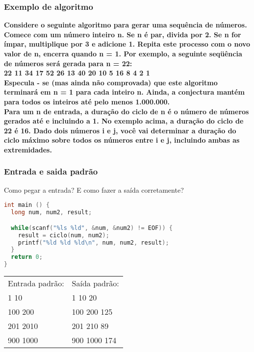 \begin{frame}
  \frametitle{Exemplo de algoritmo}
  \textbf{\small Considere o seguinte algoritmo para gerar uma sequência de números. Comece com um número inteiro n. Se n é par, divida por 2. Se n for ímpar, multiplique por 3 e adicione 1. Repita este processo com o novo valor de n, encerra quando n = 1. Por exemplo, a seguinte seqüência de números será gerada para n = 22:\\22 11 34 17 52 26 13 40 20 10 5 16 8 4 2 1\\}
  \textbf{\small Especula - se (mas ainda não comprovada) que este algoritmo terminará em n = 1 para cada inteiro n. Ainda, a conjectura mantém para todos os inteiros até pelo menos 1.000.000.\\Para um n de entrada, a duração do ciclo de n é o número de números gerados até e incluindo a 1. No exemplo acima, a duração do ciclo de 22 é 16. Dado dois números i e j, você vai determinar a duração do ciclo máximo sobre todos os números entre i e j, incluindo ambas as extremidades.}
\end{frame}

\begin{frame}[fragile]
  \frametitle{Entrada e saida padrão}
  Como pegar a entrada? E como fazer a saída corretamente?
  \begin{lstlisting}[language=c]
int main () {
  long num, num2, result;

  while(scanf("%ls %ld", &num, &num2) != EOF)) {
    result = ciclo(num, num2);
    printf("%ld %ld %ld\n", num, num2, result); 
  }
  return 0;
}
  \end{lstlisting}
  \begin{tabular}{ll}\\
    Entrada padrão: &Saída padrão:\\
    1 10 &1 10 20\\
    100 200 &100 200 125\\
    201 2010 &201 210 89\\
    900 1000 &900 1000 174\\	
  \end{tabular}
\end{frame}

